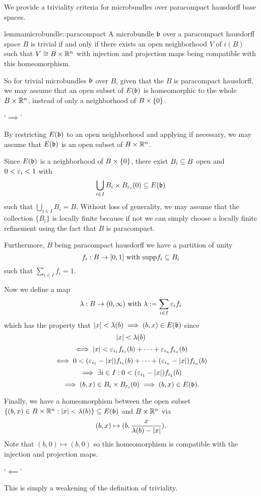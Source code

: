 \begin{myparagraph}
    We provide a triviality criteria for microbundles over paracompact hausdorff base spaces.
\end{myparagraph}

\begin{mystatement}{lemma}{microbundle::paracompact}
    A microbundle $\bb$ over a paracompact hausdorff space $B$ is trivial
    if and only if there exists an open neighborhood $V$ of $i(B)$ such that $V \cong B \times \mathbb{R}^n$
    with injection and projection maps being compatible with this homeomorphism.
\end{mystatement}

\begin{myparagraph}
    So for trivial microbundles $\bb$ over $B$, given that the $B$ is paracompact hausdorff,
    we may assume that an open subset of $E(\bb)$ is homeomorphic to the whole $B \times \mathbb{R}^n$,
    instead of only a neighborhood of $B \times{} \{0\}$.
\end{myparagraph}

\begin{myproof}
    `$\implies$'

    By restricting $E(\bb)$ to an open neighborhood
    and applying  if necessary,
    we may assume that $E(\bb)$ is an open subset of $B \times \mathbb{R}^n$.

    Since $E(\bb)$ is a neighborhood of $B \times{} \{0\}$, there exist $B_i \subseteq{} B$ open and $0 < \varepsilon{}_i < 1$ with
    \[ \bigcup_{i \in I } B_i \cross \ball[\eps_i] \sub E(\bb)\]
    such that $\bigcup_{i \in I} B_i = B$.
    Without loss of generality, we may assume that the collection $\{B_i\}$ is locally finite because if not
    we can simply choose a locally finite refinement using the fact that $B$ is paracompact.

    Furthermore, $B$ being paracompact hausdorff we have a partition of unity
    \[ f_i: B \to [0, 1] \text{ with } \text{supp}{f_i} \subseteq{} B_i\]
    such that $\sum_{i \in I}f_i = 1$.
    
    Now we define a map
    \[ \lambda: B \to (0, \infty) \text{ with } \lambda := \sum_{i \in I} \varepsilon{}_i f_i \]
    which has the property that $\abs{x} < \lambda(b) \implies (b, x) \in E(\bb)$ since
    \[ \vert{} x \vert{} < \lambda(b) \]
    \[ \iff  \vert{} x \vert{} < \varepsilon{}_{i_1} f_{i_1}(b) + \cdots + \varepsilon{}_{i_n} f_{i_n}(b) \]
    \[ \iff 0 < (\varepsilon{}_{i_1} - \vert{} x \vert{}) f_{i_1}(b) + \cdots + (\varepsilon{}_{i_n} - \vert{} x \vert{}) f_{i_n}(b) \]
    \[ \implies \exists i \in I: 0 < (\varepsilon{}_{i_1} - \vert{} x \vert{}) f_{i_1}(b) \]
    \[ \implies (b, x) \in B_i \cross \ball[\eps_i]  \implies (b, x) \in E(\bb). \]

    Finally, we have a homeomorphism between the open subset
    $\set{(b, x) \in B \cross \R^n}{\abs{x} < \lambda(b)} \sub E(\bb)$ and $B \times \mathbb{R}^n$ via
    \[ (b, x) \mapsto (b, \frac{x}{\lambda(b) - \vert{} x \vert{}}). \]
    Note that $(b, 0) \mapsto (b, 0)$ so this homeomorphism
    is compatible with the injection and projection maps.

    `$\impliedby$'

    This is simply a weakening of the definition of triviality. 
\end{myproof}
